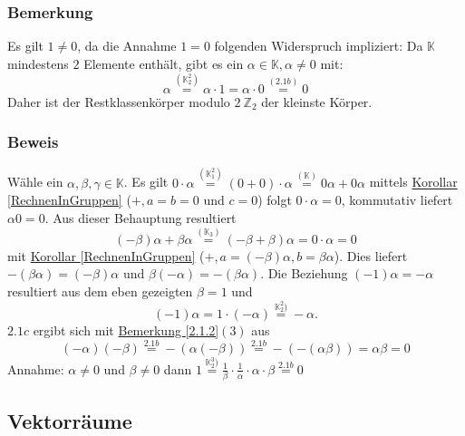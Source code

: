 \subsubsection{Bemerkung}
Es gilt $1\not=0$, da die Annahme $1=0$ folgenden Widerspruch impliziert: Da $\mathbb{K}$ mindestens $2$ Elemente enthält, gibt es ein $\alpha\in\mathbb{K}, \alpha\not= 0$ mit:
\[\alpha \stackrel{(\mathbb{K}_2^2)}{=} \alpha \cdot 1 = \alpha \cdot 0 \stackrel{\hyperref[2.1b]{(2.1b)}}{=} 0\]
Daher ist der Restklassenkörper modulo $2\ \mathbb{Z}_2$ der kleinste Körper.
\subsubsection{Beweis}
Wähle ein $\alpha ,\beta ,\gamma \in\mathbb{K}$. Es gilt $0\cdot \alpha \stackrel{(\mathbb{K}_1^2)}{=} (0+0)\cdot \alpha \stackrel{(\mathbb{K})}{=} 0\alpha + 0\alpha$ mittels \hyperref[RechnenInGruppen]{Korollar \ref*{RechnenInGruppen}} ($+,a=b=0$ und $c=0$) folgt $0\cdot \alpha = 0$, kommutativ liefert $\alpha 0 = 0$. Aus dieser Behauptung resultiert
\[(-\beta )\alpha +\beta\alpha \stackrel{(\mathbb{K}_3)}{=} (-\beta + \beta)\alpha = 0\cdot \alpha = 0\]
mit \hyperref[RechnenInGruppen]{Korollar \ref*{RechnenInGruppen}} ($+,a=(-\beta )\alpha ,b=\beta\alpha$).  Dies liefert $-(\beta\alpha )=(-\beta )\alpha$ und $\beta (-\alpha )=-(\beta\alpha )$.  Die Beziehung $(-1)\alpha = -\alpha $ resultiert aus dem eben gezeigten $\beta = 1$ und
\[(-1)\alpha = 1\cdot (-\alpha ) \stackrel{\mathbb{K}_2^2)}{=} -\alpha .\]
$2.1c$ ergibt sich mit \hyperref[2.1.2]{Bemerkung \ref*{2.1.2}}$(3)$ aus
\[(-\alpha ) (-\beta )\stackrel{2.1b}{=}-(\alpha (-\beta )) \stackrel{2.1b}{=} -(-(\alpha\beta )) = \alpha\beta =0 \]
Annahme: $\alpha \not=0$ und $\beta\not=0$ dann $1\stackrel{\mathbb{K}_2^3)}{=}\frac{1}{\beta} \cdot \frac{1}{\alpha} \cdot \alpha\cdot\beta \stackrel{2.1b}{=} 0$
\subsection{Vektorräume}
